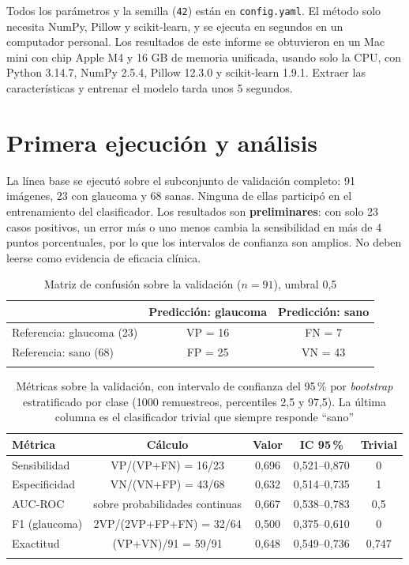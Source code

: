\documentclass[pdflatex,sn-mathphys-num]{sn-jnl}%
\theoremstyle{thmstyleone}%
\theoremstyle{thmstyletwo}%
\theoremstyle{thmstylethree}%
\begin{document}
Todos los parámetros y la semilla (\texttt{42}) están en \texttt{config.yaml}. El método solo necesita NumPy, Pillow y scikit-learn, y se ejecuta en segundos en un computador personal. Los resultados de este informe se obtuvieron en un Mac mini con chip Apple M4 y 16 GB de memoria unificada, usando solo la CPU, con Python 3.14.7, NumPy 2.5.4, Pillow 12.3.0 y scikit-learn 1.9.1. Extraer las características y entrenar el modelo tarda unos 5 segundos.


\section{Primera ejecución y análisis}\label{sec:piloto}

La línea base se ejecutó sobre el subconjunto de validación completo: 91 imágenes, 23 con glaucoma y 68 sanas. Ninguna de ellas participó en el entrenamiento del clasificador. Los resultados son \textbf{preliminares}: con solo 23 casos positivos, un error más o uno menos cambia la sensibilidad en más de 4 puntos porcentuales, por lo que los intervalos de confianza son amplios. No deben leerse como evidencia de eficacia clínica.

\begin{table}[htbp]
\caption{Matriz de confusión sobre la validación ($n = 91$), umbral 0,5}\label{tab:confusion}
\begin{tabular*}{\textwidth}{@{\extracolsep\fill}lcc}
\toprule
 & Predicción: glaucoma & Predicción: sano \\
\midrule
Referencia: glaucoma (23) & VP = 16 & FN = 7 \\
Referencia: sano (68)     & FP = 25 & VN = 43 \\
\botrule
\end{tabular*}
\end{table}

\begin{table}[htbp]
\caption{Métricas sobre la validación, con intervalo de confianza del 95\,\% por \textit{bootstrap} estratificado por clase (1000 remuestreos, percentiles 2,5 y 97,5). La última columna es el clasificador trivial que siempre responde ``sano''}\label{tab:metricas}
\begin{tabular*}{\textwidth}{@{\extracolsep\fill}lcccc}
\toprule
Métrica & Cálculo & Valor & IC 95\,\% & Trivial \\
\midrule
Sensibilidad & VP/(VP+FN) = 16/23 & 0,696 & 0,521--0,870 & 0 \\
Especificidad & VN/(VN+FP) = 43/68 & 0,632 & 0,514--0,735 & 1 \\
AUC-ROC & sobre probabilidades continuas & 0,667 & 0,538--0,783 & 0,5 \\
F1 (glaucoma) & 2VP/(2VP+FP+FN) = 32/64 & 0,500 & 0,375--0,610 & 0 \\
Exactitud & (VP+VN)/91 = 59/91 & 0,648 & 0,549--0,736 & 0,747 \\
\botrule
\end{tabular*}
\end{table}
\end{document}
